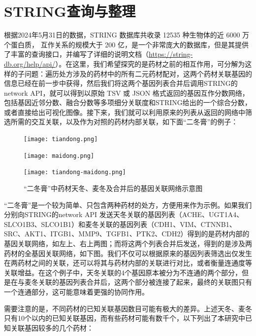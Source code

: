 \section{STRING查询与整理}

根据2024年5月31日的数据，STRING 数据库共收录 12535 种生物体的近 6000 万个蛋白质， 互作关系的规模大于 200 亿，是一个非常庞大的数据库，但是其提供了丰富的查询接口，并编写了详细的说明文档（\url{https://string-db.org/help/api/}）。在这里，我们希望探究的是药材之前的相互作用，可分解为这样的子问题：遍历处方涉及的药材中的所有二元药材配对，这两个药材关联基因的信息已经在前一步中获得，然后我们将这两个基因列表合并后调用STRING的 {network} API，就可以得到以原始 TSV 或 JSON 格式返回的基因互作分数网络，包括基因近邻分数、融合分数等多项细分关联度和STRING给出的一个综合分数，或者直接给出可视化图像。接下来，我们就可以利用原来的列表从返回的网络中筛选所需的交互关联，以及作为对照的药材内部关联，如下面“二冬膏”的例子：


\begin{figure}[H]
  \centering
  \begin{minipage}[b]{0.4\textwidth}
      \centering
      \texttt{[image: tiandong.png]}
  \end{minipage}
  \hspace{0.05\textwidth}
  \begin{minipage}[b]{0.4\textwidth}
      \centering
      \texttt{[image: maidong.png]}
  \end{minipage}

  \begin{minipage}[b]{0.95\textwidth}
      \centering
      \texttt{[image: tiandong-maidong.png]}
  \end{minipage}
  \caption{“二冬膏”中药材天冬、麦冬及合并后的基因关联网络示意图}
\end{figure}

“二冬膏”是一个较为简单、只包含两种药材的处方，方便用来作为示例。如果我们分别向STRING的{network} API 发送天冬关联的基因列表（ACHE、UGT1A4、SLCO1B3、SLCO1B1）和麦冬关联的基因列表（CDH1、VIM、CTNNB1、SRC、AKT1、ITGB1、MMP9、TGFB1、PTK2、CDH2）得到的是药材内部的基因关联网络，如左上、右上两图；而将这两个列表合并后发送，得到的是涉及两药材的全基因关联网络，如下图。我们不仅可以根据原来的基因列表筛选出仅发生在两药材之间的关联，还可以将其与药材内部的关联进行对比，或者衡量连通度等关联增益。在这个例子中，天冬关联的4个基因原本被分为不连通的两个部分，但是在与麦冬关联的基因列表合并后，这两个部分被连接了起来，最终的关联图只有一个连通部分，这可能意味着更强的协同作用。

需要注意的是，不同药材的已知关联基因数目可能有极大的差异。上述天冬、麦冬只有10个以内的已知关联基因，而有些药材可能有数千个，以下列出了本研究中已知关联基因较多的几个药材：

